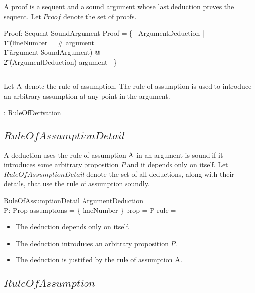 \documentclass[11pt, oneside]{article}
\begin{document}
A proof is a sequent and a sound argument whose last deduction proves the sequent.
Let $Proof$ denote the set of proofs.

\begin{axdef}
	Proof: Sequent \rel SoundArgument
\where
	Proof = \{~ ArgumentDeduction | \\
	\t1	(lineNumber = \# argument \land \\
	\t1	argument \in SoundArgument) @ \\
	\t2		\deductionSequent(\theta ArgumentDeduction) \mapsto argument ~\}
\end{axdef}


\subsection{}

Let $\operatorname{A}$ denote the rule of assumption.
The rule of assumption is used to introduce an arbitrary assumption at any point in the argument.

\begin{axdef}
	: RuleOfDerivation
\end{axdef}

\subsection{$RuleOfAssumptionDetail$}

A deduction uses the rule of assumption $\operatorname{A}$ in an argument is sound if it introduces some arbitrary proposition $P$ and
it depends only on itself.
Let $RuleOfAssumptionDetail$ denote the set of all deductions, along with their details, that use the rule of assumption soundly.

\begin{schema}{RuleOfAssumptionDetail}
	ArgumentDeduction \\
	P: Prop
\where
	assumptions = \{ lineNumber \}
\also
	prop = P
\also
	rule = 
\end{schema}

\begin{itemize}
	\item The deduction depends only on itself.
	\item The deduction introduces an arbitrary proposition $P$.
	\item The deduction is justified by the rule of assumption $\operatorname{A}$.
\end{itemize}

\subsection{$RuleOfAssumption$}
\end{document}
